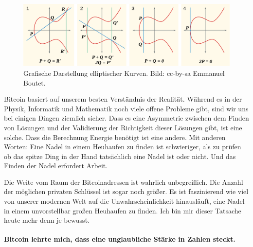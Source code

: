 \begin{figure}
  \includegraphics{assets/images/elliptic-curve-examples.png}
  \caption{Grafische Darstellung elliptischer Kurven. Bild: cc-by-sa Emmanuel Boutet.}
  \label{fig:elliptic-curve-examples}
\end{figure}

Bitcoin basiert auf unserem besten Verständnis der Realität. Während es in der
Physik, Informatik und Mathematik noch viele offene Probleme gibt, sind wir uns
bei einigen Dingen ziemlich sicher. Dass es eine Asymmetrie zwischen dem Finden
von Lösungen und der Validierung der Richtigkeit dieser Lösungen gibt, ist eine
solche. Dass die Berechnung Energie benötigt ist eine andere. Mit anderen
Worten: Eine Nadel in einem Heuhaufen zu finden ist schwieriger, als zu prüfen
ob das spitze Ding in der Hand tatsächlich eine Nadel ist oder nicht. Und das
Finden der Nadel erfordert Arbeit.

Die Weite vom Raum der Bitcoinadressen ist wahrlich unbegreiflich. Die Anzahl
der möglichen privaten Schlüssel ist sogar noch größer. Es ist faszinierend wie
viel von unserer modernen Welt auf die Unwahrscheinlichkeit hinausläuft, eine
Nadel in einem unvorstellbar großen Heuhaufen zu finden. Ich bin mir dieser
Tatsache heute mehr denn je bewusst.

\paragraph{Bitcoin lehrte mich, dass eine unglaubliche Stärke in Zahlen steckt.}

